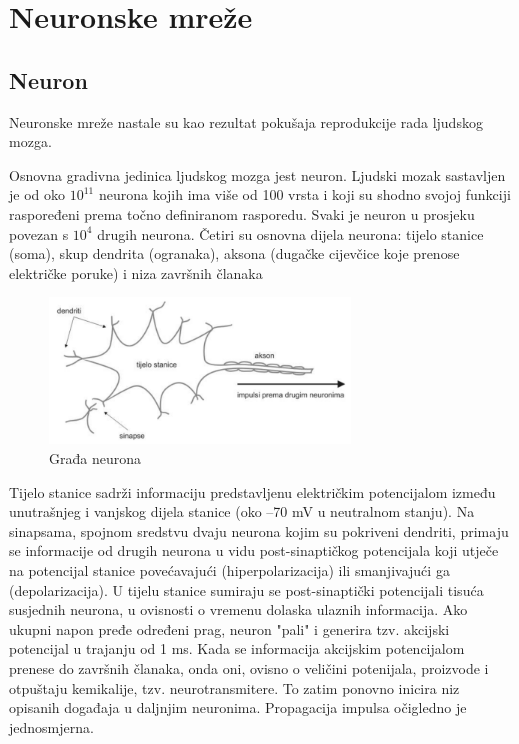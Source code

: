 \section{Neuronske mreže}

\subsection{Neuron}

Neuronske mreže nastale su kao rezultat pokušaja reprodukcije rada ljudskog mozga.

Osnovna gradivna jedinica ljudskog mozga jest neuron. Ljudski mozak sastavljen je od oko $10^11$ neurona kojih ima više od 100 vrsta i koji su shodno svojoj funkciji raspoređeni prema točno definiranom 
rasporedu. Svaki je neuron u prosjeku povezan s $10^4$ drugih neurona. Četiri su osnovna dijela neurona: tijelo stanice (soma), skup dendrita (ogranaka), aksona (dugačke cijevčice koje prenose električke poruke) i niza završnih članaka 

\begin{figure}[htb]
\centering
\includegraphics[width=8cm]{img/Neuron.png}
\caption{Građa neurona}
\label{img:human-neuron}
\end{figure}

Tijelo stanice sadrži informaciju predstavljenu električkim potencijalom između unutrašnjeg i vanjskog dijela stanice (oko –70 mV u neutralnom stanju). Na sinapsama, spojnom sredstvu dvaju neurona kojim su pokriveni dendriti, primaju se informacije od drugih neurona u vidu post-sinaptičkog potencijala koji utječe na potencijal stanice povećavajući (hiperpolarizacija) ili smanjivajući ga (depolarizacija). U tijelu stanice sumiraju se post-sinaptički potencijali tisuća susjednih neurona, u ovisnosti o vremenu dolaska ulaznih informacija. Ako ukupni napon pređe određeni prag, neuron "pali" i generira tzv. akcijski potencijal u trajanju od 1 ms. Kada se informacija akcijskim potencijalom prenese do završnih članaka, onda oni, ovisno o veličini potenijala, proizvode i otpuštaju kemikalije, tzv. neurotransmitere. To zatim ponovno inicira niz opisanih događaja u daljnjim neuronima. Propagacija impulsa očigledno je jednosmjerna. 

